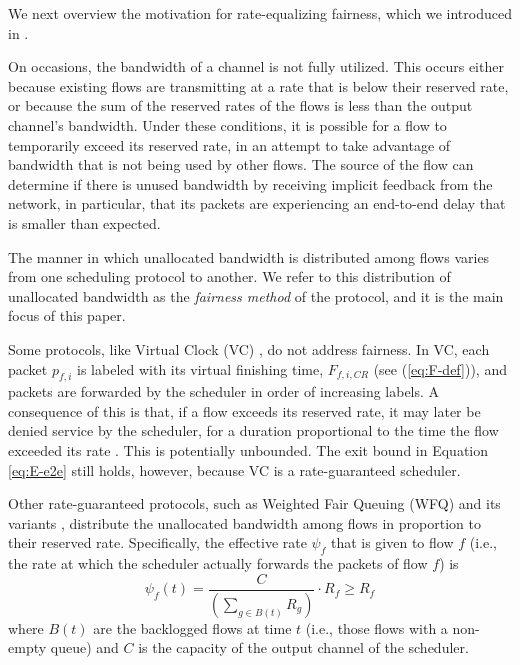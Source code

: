 \documentclass[conference]{IEEEtran}
\begin{document}
We next overview the motivation for rate-equalizing fairness, which we 
introduced in \cite{Cobb-REQ}.

On occasions, the bandwidth of a channel is not fully utilized. This occurs 
either because existing flows are transmitting at a rate that is below their 
reserved rate, or because the sum of the reserved rates of the flows is less 
than the output channel's bandwidth. Under these conditions, it is possible for 
a flow to temporarily exceed its reserved rate, in an attempt to take advantage 
of bandwidth that is not being used by other flows. The source of the flow can 
determine if there is unused bandwidth by receiving implicit feedback from the 
network, in particular, that its packets are experiencing an end-to-end delay 
that is smaller than expected.

The manner in which unallocated bandwidth is distributed among flows varies 
from one scheduling protocol to another. We refer to this distribution of 
unallocated bandwidth as the {\em fairness method} of the protocol, and it is 
the main focus of this paper.

Some protocols, like Virtual Clock (VC) \cite{VC-Lixia}\cite{VC-Lam}, do not 
address fairness. In VC, each packet $p_{f,i}$ is labeled with its virtual 
finishing time, $F_{f,i,CR}$ (see (\ref{eq:F-def})), and packets are forwarded 
by the scheduler in order of increasing labels. A consequence of this is that, 
if a flow exceeds its reserved rate, it may later be denied service by the 
scheduler, for a duration proportional to the time the flow exceeded its rate 
\cite{Cobb-TS-Scheduling-ToN}. This is potentially unbounded. The exit bound in 
Equation \eqref{eq:E-e2e} still holds, however, because VC is a rate-guaranteed 
scheduler.

Other rate-guaranteed protocols, such as Weighted Fair Queuing (WFQ) 
\cite{GPS-Parekh} and its variants  \cite{Hui-Hierarchical-WFQ} 
\cite{Cobb-TS-Scheduling-ToN} \cite{SCFQ-Golestani} \cite{Hui-WF2Q}, distribute 
the unallocated bandwidth among flows in proportion to their reserved rate.  
Specifically, the effective rate $\psi_f$ that is given to flow $f$ (i.e., the 
rate at which the scheduler actually forwards the packets of flow $f$) is
\begin{equation}
\label{eq:WFQ-Share}
\psi_f(t) = \frac{C}{\left(\sum_{g \in B(t)} R_g \right)}\cdot R_f \geq R_f
\end{equation}
where $B(t)$ are the backlogged flows at time $t$ (i.e., those flows with a 
non-empty queue) and $C$ is the capacity of the output channel of the 
scheduler.
\end{document}
